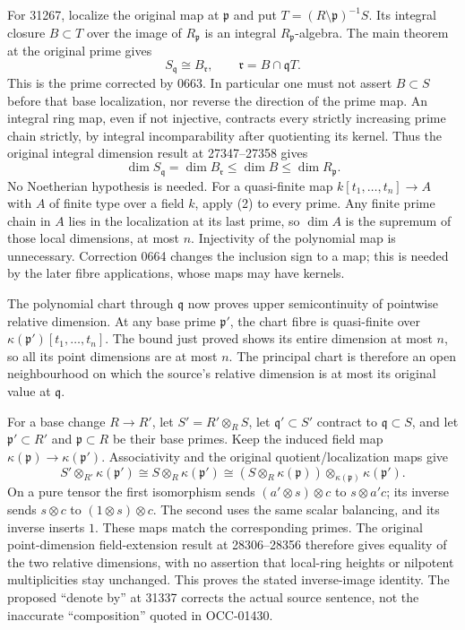 For 31267, localize the original map at \(\mathfrak p\) and put \(T=(R\setminus\mathfrak p)^{-1}S\). Its integral closure \(B\subset T\) over the image of \(R_{\mathfrak p}\) is an integral \(R_{\mathfrak p}\)-algebra. The main theorem at the original prime gives \[
 S_{\mathfrak q}\cong B_{\mathfrak r},
 \qquad \mathfrak r=B\cap\mathfrak qT.
\] This is the prime corrected by 0663. In particular one must not assert \(B\subset S\) before that base localization, nor reverse the direction of the prime map. An integral ring map, even if not injective, contracts every strictly increasing prime chain strictly, by integral incomparability after quotienting its kernel. Thus the original integral dimension result at 27347--27358 gives \[
 \dim S_{\mathfrak q}
 =\dim B_{\mathfrak r}
 \leq\dim B
 \leq\dim R_{\mathfrak p}.
 \tag{2}
\] No Noetherian hypothesis is needed. For a quasi-finite map \(k[t_1,\ldots,t_n]\to A\) with \(A\) of finite type over a field \(k\), apply (2) to every prime. Any finite prime chain in \(A\) lies in the localization at its last prime, so \(\dim A\) is the supremum of those local dimensions, at most \(n\). Injectivity of the polynomial map is unnecessary. Correction 0664 changes the inclusion sign to a map; this is needed by the later fibre applications, whose maps may have kernels.

The polynomial chart through \(\mathfrak q\) now proves upper semicontinuity of pointwise relative dimension. At any base prime \(\mathfrak p'\), the chart fibre is quasi-finite over \(\kappa(\mathfrak p')[t_1,\ldots,t_n]\). The bound just proved shows its entire dimension at most \(n\), so all its point dimensions are at most \(n\). The principal chart is therefore an open neighbourhood on which the source's relative dimension is at most its original value at \(\mathfrak q\).

For a base change \(R\to R'\), let \(S'=R'\otimes_R S\), let \(\mathfrak q'\subset S'\) contract to \(\mathfrak q\subset S\), and let \(\mathfrak p'\subset R'\) and \(\mathfrak p\subset R\) be their base primes. Keep the induced field map \(\kappa(\mathfrak p)\to\kappa(\mathfrak p')\). Associativity and the original quotient/localization maps give \[
 S'\otimes_{R'}\kappa(\mathfrak p')
 \cong S\otimes_R\kappa(\mathfrak p')
 \cong
 (S\otimes_R\kappa(\mathfrak p))
                   \otimes_{\kappa(\mathfrak p)}\kappa(\mathfrak p').
 \tag{3}
\] On a pure tensor the first isomorphism sends \((a'\otimes s)\otimes c\) to \(s\otimes a'c\); its inverse sends \(s\otimes c\) to \((1\otimes s)\otimes c\). The second uses the same scalar balancing, and its inverse inserts \(1\). These maps match the corresponding primes. The original point-dimension field-extension result at 28306--28356 therefore gives equality of the two relative dimensions, with no assertion that local-ring heights or nilpotent multiplicities stay unchanged. This proves the stated inverse-image identity. The proposed ``denote by'' at 31337 corrects the actual source sentence, not the inaccurate ``composition'' quoted in OCC-01430.

